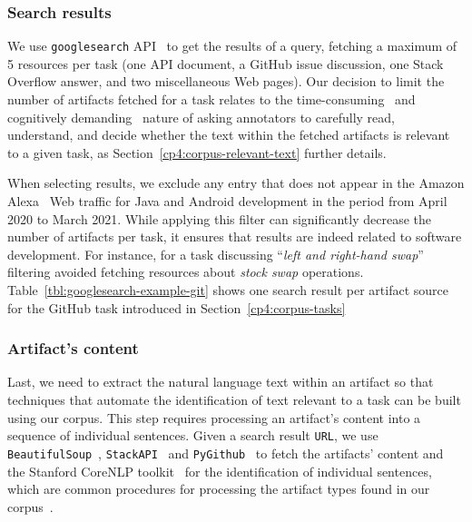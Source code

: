 \subsubsection{Search results}


We use \texttt{googlesearch} API~\cite{googlesearch} to get the results of a query,
fetching a maximum of 5 resources per task 
(one API document, a GitHub issue discussion, one Stack Overflow answer, and two miscellaneous Web pages).
Our decision to limit the number of artifacts fetched for a task relates to the
time-consuming~\cite{Zhang2013, al2017} and cognitively demanding~\cite{Piorkowski2016, Bystrom1995, clark2013relevance} 
nature of asking annotators to carefully read, understand, and decide whether the text
within the fetched artifacts is relevant to a given task, as Section~\ref{cp4:corpus-relevant-text} further details.




When selecting results, we exclude any entry that does not appear in the Amazon Alexa~\cite{alexa} Web traffic for Java and Android development in the period from April 2020 to March 2021. 
While applying this filter can significantly decrease the number of artifacts per task, it ensures that results are indeed related to software development. 
For instance, for a task discussing ``\textit{left and right-hand swap}'' 
filtering avoided fetching resources about  \textit{stock swap} operations.
Table~\ref{tbl:googlesearch-example-git} shows one search result per artifact source for the GitHub task introduced in Section~\ref{cp4:corpus-tasks}







\subsubsection{Artifact's content}

Last, we need to extract the natural language text within an artifact so that 
techniques that automate the identification of text relevant to a task can be built 
using our corpus.  This step requires processing an artifact's content 
into a sequence of individual sentences.
Given a search result \texttt{URL}, we use \texttt{BeautifulSoup}~\cite{beautifulsoup4},
\texttt{StackAPI}~\cite{StackAPI} and \texttt{PyGithub}~\cite{PyGithub}
to fetch the artifacts' content
and the Stanford CoreNLP toolkit~\cite{CoreNLP} for the identification of 
individual sentences,
which are common procedures for processing the artifact types found in our corpus~\cite{Arya2019, nadi2020}.










